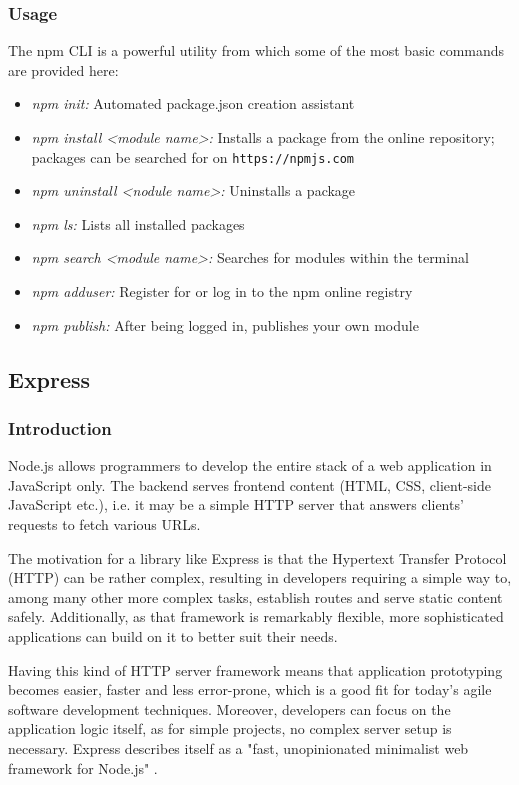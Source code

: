 \documentclass{bioinfo}
\begin{document}
\subsubsection{Usage}
The npm CLI is a powerful utility \cite{npmcli} from which some of the most basic commands are provided here:
\begin{itemize}
    \item \textit{npm init:} Automated package.json creation assistant
    \item \textit{npm install <module name>:} Installs a package from the online repository; packages can be searched for on \texttt{https://npmjs.com}
    \item \textit{npm uninstall <nodule name>:} Uninstalls a package
    \item \textit{npm ls:} Lists all installed packages
    \item \textit{npm search <module name>:} Searches for modules within the terminal
    \item \textit{npm adduser:} Register for or log in to the npm online registry
    \item \textit{npm publish:} After being logged in, publishes your own module 
    
\end{itemize}

\subsection{Express}

\subsubsection{Introduction}

Node.js allows programmers to develop the entire stack of a web application in JavaScript only. The backend serves frontend content (HTML, CSS, client-side JavaScript etc.), i.e. it may be a simple HTTP server that answers clients' requests to fetch various URLs.

The motivation for a library like Express is that the Hypertext Transfer Protocol (HTTP) can be rather complex, resulting in developers requiring a simple way to, among many other more complex tasks, establish routes and serve static content safely. Additionally, as that framework is remarkably flexible, more sophisticated applications can build on it to better suit their needs.

Having this kind of HTTP server framework means that application prototyping becomes easier, faster and less error-prone, which is a good fit for today's agile software development techniques. Moreover, developers can focus on the application logic itself, as for simple projects, no complex server setup is necessary. Express describes itself as a "fast, unopinionated minimalist web framework for Node.js" \cite{expresshome}.
\end{document}
